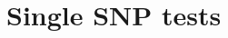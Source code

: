 \documentclass[xcolor=pdftex,dvipsnames,table,10pt]{beamer}
\begin{document}
\begin{frame}
\begin{itemize}
\begin{itemize}
    \end{itemize}
  \end{itemize}
\end{frame}

\section{Single SNP tests}
\end{document}
